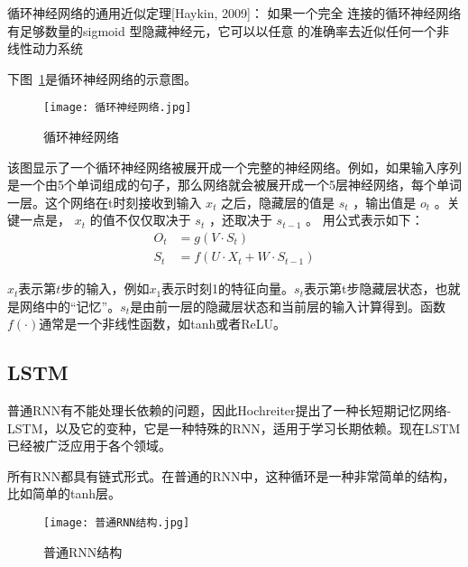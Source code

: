 循环神经网络的通用近似定理[Haykin, 2009]： 如果一个完全
连接的循环神经网络有足够数量的sigmoid 型隐藏神经元，它可以以任意
的准确率去近似任何一个非线性动力系统

下图~\ref{fig:循环神经网络}是循环神经网络的示意图。
\begin{figure}
    \centering
    \texttt{[image: 循环神经网络.jpg]}
    \caption{循环神经网络}
    \label{fig:循环神经网络}
  \end{figure}
该图显示了一个循环神经网络被展开成一个完整的神经网络。例如，如果输入序列是一个由5个单词组成的句子，那么网络就会被展开成一个5层神经网络，每个单词一层。这个网络在t时刻接收到输入 $x_t$ 之后，隐藏层的值是 $s_t$ ，输出值是 $o_t$ 。关键一点是， $x_t$ 的值不仅仅取决于 $s_t$ ，还取决于 $s_{t-1}$ 。
  用公式表示如下：
  \begin{equation}
      \begin{aligned}
          O_t &= g(V\cdot S_t) \\
          S_t &= f(U\cdot X_t + W\cdot S_{t-1})
      \end{aligned}
  \end{equation}

  $x_t$表示第$t$步的输入，例如$x_1$表示时刻1的特征向量。$s_t$表示第t步隐藏层状态，也就是网络中的“记忆”。$s_t$是由前一层的隐藏层状态和当前层的输入计算得到。函数$f(\cdot)$通常是一个非线性函数，如tanh或者ReLU。

\subsection{LSTM}
普通RNN有不能处理长依赖的问题，因此Hochreiter提出了一种长短期记忆网络-LSTM，以及它的变种，它是一种特殊的RNN，适用于学习长期依赖。现在LSTM已经被广泛应用于各个领域。

所有RNN都具有链式形式。在普通的RNN中，这种循环是一种非常简单的结构，比如简单的tanh层。
\begin{figure}
    \centering
    \texttt{[image: 普通RNN结构.jpg]}
    \caption{普通RNN结构}
    \label{fig:普通RNN结构}
  \end{figure}

